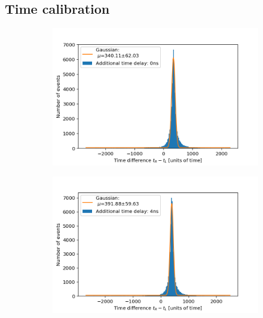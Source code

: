 \documentclass[]{article}
\begin{document}
\subsection{Time calibration}
\begin{figure}[H]
\centering
\medskip
\begin{subfigure}{0.48\textwidth}
\includegraphics[width=\linewidth]{Plots/Time/0ns.png}
\end{subfigure}
\begin{subfigure}[c]{0.48\linewidth}
\includegraphics[width=\linewidth]{Plots/Time/4ns.png}
\end{subfigure}


\end{figure}
\end{document}
